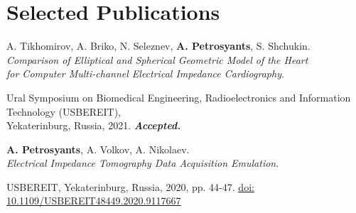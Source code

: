 \section{Selected Publications}
\resumeSubHeadingListStart

\resumeProjectHeading
  {A. Tikhomirov, A. Briko, N. Seleznev, \textbf{A. Petrosyants}, S. Shchukin.\\
  \textit{Comparison of Elliptical and Spherical Geometric
  Model of the Heart}\\
  \textit{for Computer Multi-channel Electrical Impedance Cardiography}.}{}
      \begin{itemize}[leftmargin=0in, label={}]
        \small{\item{
          {Ural Symposium on Biomedical Engineering, Radioelectronics and Information Technology (USBEREIT), \\ 
          Yekaterinburg, Russia, 2021.}
          {\textbf{\textit{Accepted.}}}
        }}
      \end{itemize}

\resumeProjectHeading
    {\textbf{A. Petrosyants}, A. Volkov, A. Nikolaev.\\
  \textit{Electrical Impedance Tomography Data Acquisition Emulation}.}{}
      \begin{itemize}[leftmargin=0in, label={}]
      \small{\item{
        {USBEREIT, Yekaterinburg, Russia, 2020, pp. 44-47.}
        {\href{https://ieeexplore.ieee.org/abstract/document/9117667/}{\underline{doi: 10.1109/USBEREIT48449.2020.9117667}}}
      }}
      \end{itemize}
\resumeSubHeadingListEnd